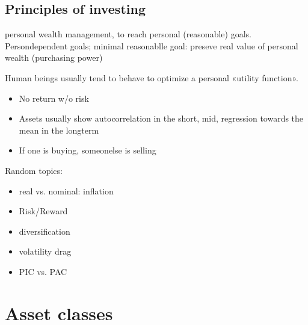 \documentclass[letterpaper,10pt,italian]{jupyterBook}
\begin{document}
\sphinxstepscope


\chapter{Principles of investing}
\label{\detokenize{ch/principles/intro:principles-of-investing}}\label{\detokenize{ch/principles/intro:fin-edu-principles}}\label{\detokenize{ch/principles/intro::doc}}
\sphinxAtStartPar
{} personal wealth management, to reach personal (reasonable) goals. Person\sphinxhyphen{}dependent goals; minimal reasonablle goal: preseve real value of personal wealth (purchasing power)

\sphinxAtStartPar
Human beings usually tend to behave to optimize a personal «utility function».

\sphinxAtStartPar
{}
\begin{itemize}
\item {} 
\sphinxAtStartPar
No return w/o risk

\item {} 
\sphinxAtStartPar
Assets usually show auto\sphinxhyphen{}correlation in the short\sphinxhyphen{}, mid\sphinxhyphen{}, regression towards the mean in the long\sphinxhyphen{}term

\item {} 
\sphinxAtStartPar
If one is buying, someonelse is selling

\end{itemize}

\sphinxAtStartPar
Random topics:
\begin{itemize}
\item {} 
\sphinxAtStartPar
real vs. nominal: inflation

\item {} 
\sphinxAtStartPar
Risk/Reward

\item {} 
\sphinxAtStartPar
diversification

\item {} 
\sphinxAtStartPar
volatility drag

\item {} 
\sphinxAtStartPar
PIC vs. PAC

\end{itemize}

\sphinxstepscope


\part{Asset classes}
\end{document}
